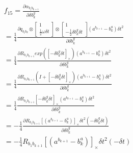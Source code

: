 \documentclass[UTF8]{ctexart}
\begin{document}
\begin{equation}
\begin{aligned}
&f_{15}=\frac{\partial\alpha _{b_ib_{k+1}}}{\partial\delta b_k^g}\\
&=\frac{1}{4}
\frac{ 
    \partial q_{b_ib_k}\otimes 
    \begin{bmatrix}
        1\\
        \frac{1}{2}\omega\delta t
    \end{bmatrix}
    \otimes
    \begin{bmatrix}
        1\\
        -\frac{1}{2}\delta b_k^g \delta t
    \end{bmatrix}  (a^{b_{k+1}}-b^a_k)\delta t^2
}{\partial \delta b_k^g}\\
&=\frac{1}{4}\frac
{
    \partial R_{b_1b_{k+1}}exp([-\delta b_k^g \delta t]_\times)
    (a^{b_{k+1}}-b^a_k)\delta t^2
}
{\partial \delta b_k^g}\\
&=\frac{1}{4}\frac
{
    \partial R_{b_1b_{k+1}}(I+[-\delta b_k^g \delta t]_\times)
    (a^{b_{k+1}}-b^a_k)\delta t^2 
}{\partial \delta b_k^g}\\
&=\frac{1}{4}\frac
{
    \partial R_{b_1b_{k+1}}[-\delta b_k^g \delta t]_\times
    (a^{b_{k+1}}-b^a_k)\delta t^2 
}{\partial \delta b_k^g}\\
&=-\frac{1}{4}\frac
{
    \partial R_{b_1b_{k+1}}[(a^{b_{k+1}}-b^a_k)]_\times \delta t^2
    (-\delta b_k^g \delta t)   
}{\partial \delta b_k^g}\\
&=-\frac{1}{4} R_{b_1b_{k+1}}[(a^{b_{k+1}}-b^a_k)]_\times \delta t^2(- \delta t)\\
\end{aligned}
\end{equation}
\end{document}

